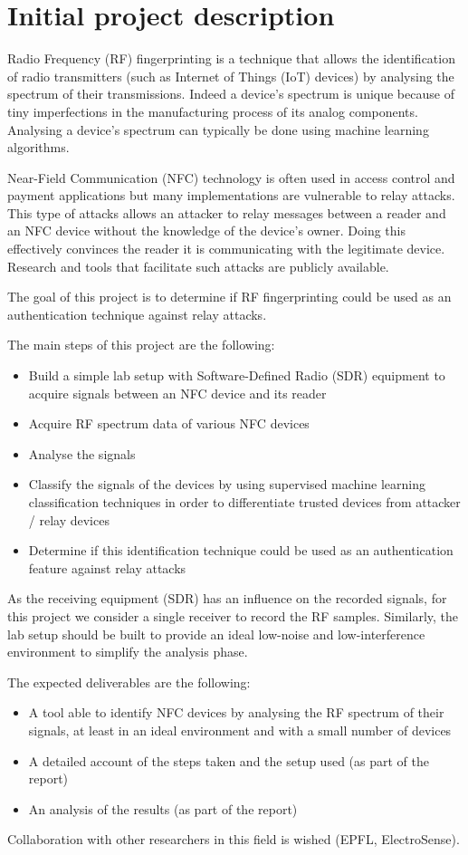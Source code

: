 \section{Initial project description}

Radio Frequency (RF) fingerprinting is a technique that allows the identification of radio transmitters (such as Internet of Things (IoT) devices) by analysing the spectrum of their transmissions. Indeed a device's spectrum is unique because of tiny imperfections in the manufacturing process of its analog components. Analysing a device's spectrum can typically be done using machine learning algorithms.

Near-Field Communication (NFC) technology is often used in access control and payment applications but many implementations are vulnerable to relay attacks. This type of attacks allows an attacker to relay messages between a reader and an NFC device without the knowledge of the device's owner. Doing this effectively convinces the reader it is communicating with the legitimate device. Research and tools that facilitate such attacks are publicly available.

The goal of this project is to determine if RF fingerprinting could be used as an authentication technique against relay attacks.

The main steps of this project are the following:

\begin{itemize}
  \item Build a simple lab setup with Software-Defined Radio (SDR) equipment to acquire signals between an NFC device and its reader
  \item Acquire RF spectrum data of various NFC devices
  \item Analyse the signals
  \item Classify the signals of the devices by using supervised machine learning classification techniques in order to differentiate trusted devices from attacker / relay devices
  \item Determine if this identification technique could be used as an authentication feature against relay attacks
\end{itemize}

As the receiving equipment (SDR) has an influence on the recorded signals, for this project we consider a single receiver to record the RF samples. Similarly, the lab setup should be built to provide an ideal low-noise and low-interference environment to simplify the analysis phase.

The expected deliverables are the following:

\begin{itemize}
  \item A tool able to identify NFC devices by analysing the RF spectrum of their signals, at least in an ideal environment and with a small number of devices
  \item A detailed account of the steps taken and the setup used (as part of the report)
  \item An analysis of the results (as part of the report)
\end{itemize}

Collaboration with other researchers in this field is wished (EPFL, ElectroSense).
